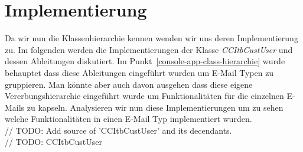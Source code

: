\section{Implementierung}
Da wir nun die Klassenhierarchie kennen wenden wir uns deren Implementierung zu. Im folgenden werden die Implementierungen der Klasse \emph{CCItbCustUser} und dessen Ableitungen diskutiert. Im Punkt~\ref{console-app-class-hierarchie} wurde behauptet dass diese Ableitungen eingeführt wurden um E-Mail Typen zu gruppieren. Man könnte aber auch davon ausgehen dass diese eigene Vererbungshierarchie eingeführt wurde um Funktionalitäten für die einzelnen E-Mails zu kapseln. Analysieren wir nun diese Implementierungen um zu sehen welche Funktionalitäten in einen E-Mail Typ implementiert wurden.
\\
// TODO: Add source of 'CCItbCustUser' and its decendants. \\
// TODO: CCItbCustUser \\\\


\newpage

